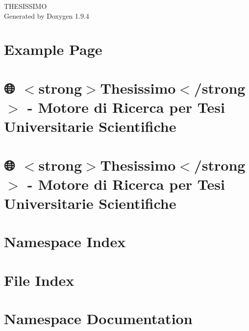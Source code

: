 \documentclass[twoside]{book}
\newcommand{\+}{\discretionary{\mbox{\scriptsize$\hookleftarrow$}}{}{}}
\newcommand{\clearemptydoublepage}{%
    \newpage{\pagestyle{empty}\cleardoublepage}%
  }
\begin{document}
  \raggedbottom
    \hypersetup{pageanchor=false,
                bookmarksnumbered=true,
                pdfencoding=unicode
               }
  \begin{titlepage}
  \vspace*{7cm}
  \begin{center}%
  {\Large THESISSIMO}\\
  \vspace*{1cm}
  {\large Generated by Doxygen 1.9.4}\\
  \end{center}
  \end{titlepage}
  \clearemptydoublepage
  \tableofcontents
  \clearemptydoublepage
  \hypersetup{pageanchor=true}
\chapter{Example Page}
\label{page1}

\chapter{🌐 \texorpdfstring{$<$}{<}strong\texorpdfstring{$>$}{>}Thesissimo\texorpdfstring{$<$}{<}/strong\texorpdfstring{$>$}{>} -\/ Motore di Ricerca per Tesi Universitarie Scientifiche}
\label{md_README}

\chapter{🌐 \texorpdfstring{$<$}{<}strong\texorpdfstring{$>$}{>}Thesissimo\texorpdfstring{$<$}{<}/strong\texorpdfstring{$>$}{>} -\/ Motore di Ricerca per Tesi Universitarie Scientifiche}
\label{md__root_JuriScan_README}

\chapter{Namespace Index}

\chapter{File Index}

\chapter{Namespace Documentation}





















\end{document}
